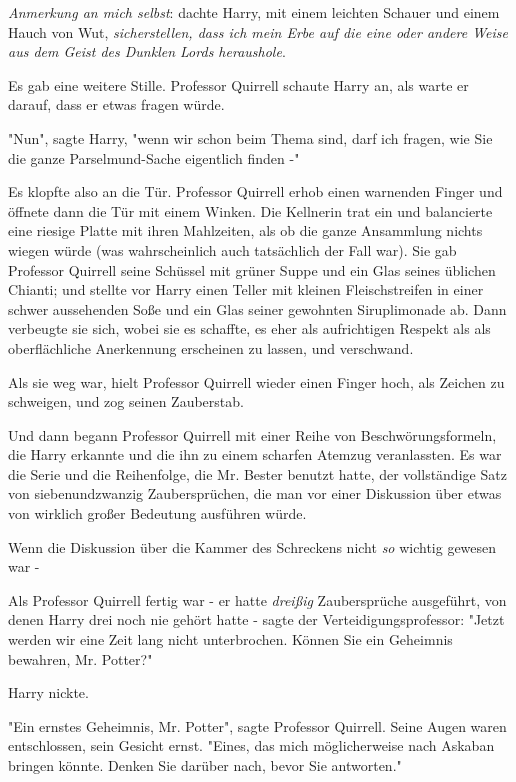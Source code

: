 {\emph{Anmerkung an mich selbst}: dachte Harry, mit einem leichten Schauer und einem Hauch von Wut, \emph{sicherstellen, dass ich mein Erbe auf die eine oder andere Weise aus dem Geist des Dunklen Lords heraushole}.

Es gab eine weitere Stille. Professor Quirrell schaute Harry an, als warte er darauf, dass er etwas fragen würde.

"Nun", sagte Harry, "wenn wir schon beim Thema sind, darf ich fragen, wie Sie die ganze Parselmund-Sache eigentlich finden -"

Es klopfte also an die Tür. Professor Quirrell erhob einen warnenden Finger und öffnete dann die Tür mit einem Winken. Die Kellnerin trat ein und balancierte eine riesige Platte mit ihren Mahlzeiten, als ob die ganze Ansammlung nichts wiegen würde (was wahrscheinlich auch tatsächlich der Fall war). Sie gab Professor Quirrell seine Schüssel mit grüner Suppe und ein Glas seines üblichen Chianti; und stellte vor Harry einen Teller mit kleinen Fleischstreifen in einer schwer aussehenden Soße und ein Glas seiner gewohnten Siruplimonade ab. Dann verbeugte sie sich, wobei sie es schaffte, es eher als aufrichtigen Respekt als als oberflächliche Anerkennung erscheinen zu lassen, und verschwand.

Als sie weg war, hielt Professor Quirrell wieder einen Finger hoch, als Zeichen zu schweigen, und zog seinen Zauberstab.

Und dann begann Professor Quirrell mit einer Reihe von Beschwörungsformeln, die Harry erkannte und die ihn zu einem scharfen Atemzug veranlassten. Es war die Serie und die Reihenfolge, die Mr. Bester benutzt hatte, der vollständige Satz von siebenundzwanzig Zaubersprüchen, die man vor einer Diskussion über etwas von wirklich großer Bedeutung ausführen würde.

Wenn die Diskussion über die Kammer des Schreckens nicht \emph{so} wichtig gewesen war -

Als Professor Quirrell fertig war - er hatte \emph{dreißig} Zaubersprüche ausgeführt, von denen Harry drei noch nie gehört hatte - sagte der Verteidigungsprofessor: "Jetzt werden wir eine Zeit lang nicht unterbrochen. Können Sie ein Geheimnis bewahren, Mr. Potter?"

Harry nickte.

"Ein ernstes Geheimnis, Mr. Potter", sagte Professor Quirrell. Seine Augen waren entschlossen, sein Gesicht ernst. "Eines, das mich möglicherweise nach Askaban bringen könnte. Denken Sie darüber nach, bevor Sie antworten."

}
